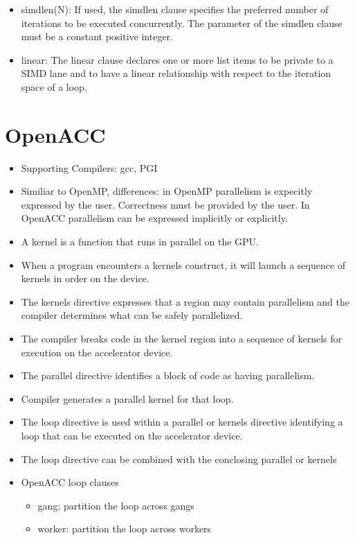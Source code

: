 \documentclass[paper=a4, fontsize=11pt]{scrartcl} %
\numberwithin{equation}{section} %
\numberwithin{figure}{section} %
\numberwithin{table}{section} %
\begin{document}
\begin{itemize}
\begin{itemize}
    \item simdlen(N): If used, the simdlen clause specifies the preferred number of iterations to be executed concurrently. The parameter of the simdlen clause must be a constant positive integer.
    \item linear: The linear clause declares one or more list items to be private to a SIMD lane and to have a linear relationship with respect to the iteration space of a loop.
  \end{itemize}
\end{itemize}

\section{OpenACC}

\begin{itemize}
  \item Supporting Compilers: gcc, PGI
  \item Similiar to OpenMP, differences: in OpenMP parallelism is expecitly expressed by the user. Correctness must be provided by the user. In OpenACC parallelism can be expressed implicitly or explicitly.
  \item A kernel is a function that runs in parallel on the GPU.
  \item When a program encounters a kernels construct, it will launch a sequence of kernels in order on the device.
  \item The kernels directive expresses that a region may contain parallelism and the compiler determines what can be safely parallelized.
  \item The compiler breaks code in the kernel region into a sequence of kernels for execution on the accelerator device.
  \item The parallel directive identifies a block of code as having parallelism.
  \item Compiler generates a parallel kernel for that loop.
  \item The loop directive is used within a parallel or kernels directive identifying a loop that can be executed on the accelerator device.
  \item The loop directive can be combined with the conclosing parallel or kernels
  \item OpenACC loop clauses
  \begin{itemize}
    \item gang: partition the loop across gangs
    \item worker: partition the loop across workers

\end{itemize}
\end{itemize}
\end{document}
